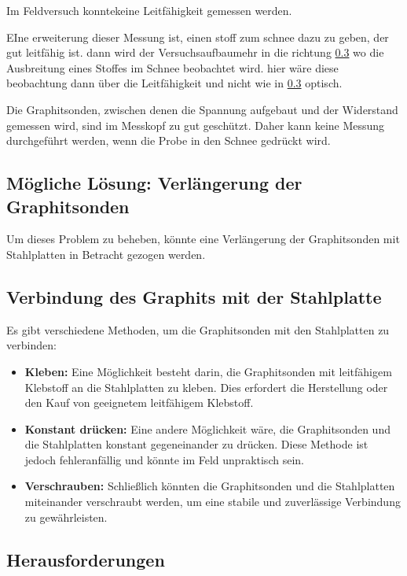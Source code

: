 Im Feldversuch konntekeine Leitfähigkeit gemessen werden.

EIne erweiterung dieser Messung ist, einen stoff zum schnee dazu zu geben, der gut leitfähig ist. dann wird der Versuchsaufbaumehr in die richtung \ref{} wo die Ausbreitung eines Stoffes im Schnee beobachtet wird. hier wäre diese beobachtung dann über die Leitfähigkeit und nicht wie in \ref{} optisch.

Die Graphitsonden, zwischen denen die Spannung aufgebaut und der Widerstand gemessen wird, sind im Messkopf zu gut geschützt. Daher kann keine Messung durchgeführt werden, wenn die Probe in den Schnee gedrückt wird.


\subsection{Mögliche Lösung: Verlängerung der Graphitsonden}

Um dieses Problem zu beheben, könnte eine Verlängerung der Graphitsonden mit Stahlplatten in Betracht gezogen werden.

\subsection{Verbindung des Graphits mit der Stahlplatte}

Es gibt verschiedene Methoden, um die Graphitsonden mit den Stahlplatten zu verbinden:

\begin{itemize}
    \item \textbf{Kleben:} Eine Möglichkeit besteht darin, die Graphitsonden mit leitfähigem Klebstoff an die Stahlplatten zu kleben. Dies erfordert die Herstellung oder den Kauf von geeignetem leitfähigem Klebstoff.
    \item \textbf{Konstant drücken:} Eine andere Möglichkeit wäre, die Graphitsonden und die Stahlplatten konstant gegeneinander zu drücken. Diese Methode ist jedoch fehleranfällig und könnte im Feld unpraktisch sein.
    \item \textbf{Verschrauben:} Schließlich könnten die Graphitsonden und die Stahlplatten miteinander verschraubt werden, um eine stabile und zuverlässige Verbindung zu gewährleisten.
\end{itemize}

\subsection{Herausforderungen}

